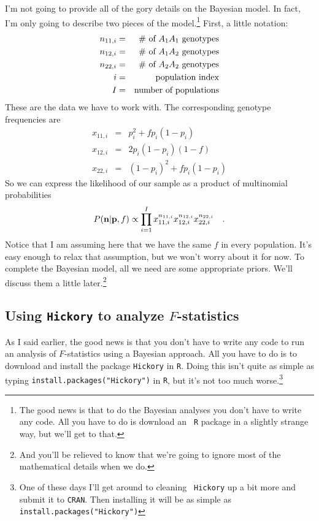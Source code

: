 I'm not going to provide all of the gory details on the Bayesian
model. In fact, I'm only going to describe two pieces of the
model.\footnote{The good news is that to do the Bayesian analyses you
  don't have to write any code. All you have to do is download an {\tt
    R} package in a slightly strange way, but we'll get to that.}
First, a little notation:
\begin{eqnarray*}
n_{11,i} &=& \hbox{\# of $A_1A_1$ genotypes} \\
n_{12,i} &=& \hbox{\# of $A_1A_2$ genotypes} \\
n_{22,i} &=& \hbox{\# of $A_2A_2$ genotypes} \\
i         &=& \hbox{population index} \\
I         &=& \hbox{number of populations} \\
\end{eqnarray*}
These are the data we have to work with. The corresponding genotype
frequencies are
\begin{eqnarray*}
x_{11,i} &=& p_{i}^2 + fp_{i}(1-p_{i}) \\
x_{12,i} &=& 2p_{i}(1-p_{i})(1-f) \\
x_{22,i} &=& (1-p_{i})^2 + fp_{i}(1-p_{i})
\end{eqnarray*}
So we can express the likelihood of our sample as a product of
multinomial probabilities
\[
P({\bf n}|{\bf p},f) \propto \prod_{i=1}^I x_{11,i}^{n_{11,i}}
x_{12,i}^{n_{12,i}} x_{22,i}^{n_{22,i}} \quad .
\]
Notice that I am assuming here that we have the same $f$ in every
population. It's easy enough to relax that assumption, but we won't
worry about it for now. To complete the Bayesian model, all we need
are some appropriate priors. We'll discuss them a little
later.\footnote{And you'll be relieved to know that we're going to
  ignore most of the mathematical details when we do.}

\subsection*{Using {\tt Hickory} to analyze $F$-statistics}

As I said earlier, the good news is that you don't have to write any
code to run an analysis of $F$-statistics using a Bayesian
approach. All you have to do is to download and install the package
{\tt Hickory} in {\tt R}. Doing this isn't quite as simple as typing
{\tt install.packages("Hickory")} in {\tt R}, but it's not too much
worse.\footnote{One of these days I'll get around to cleaning {\tt
    Hickory} up a bit more and submit it to {\tt CRAN}. Then
  installing it will be as simple as {\tt
    install.packages("Hickory")}} 

